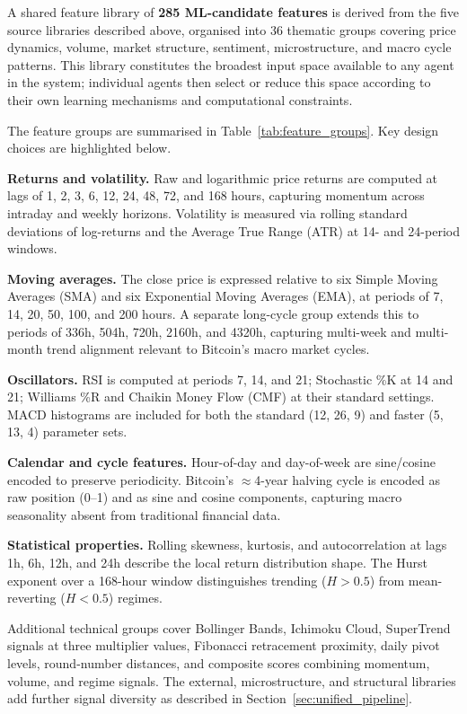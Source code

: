 A shared feature library of \textbf{285 ML-candidate features} is derived from the five source libraries described above, organised into 36 thematic groups covering price dynamics, volume, market structure, sentiment, microstructure, and macro cycle patterns. This library constitutes the broadest input space available to any agent in the system; individual agents then select or reduce this space according to their own learning mechanisms and computational constraints.


The feature groups are summarised in Table~\ref{tab:feature_groups}. Key design choices are highlighted below.


\textbf{Returns and volatility.} Raw and logarithmic price returns are computed at lags of 1, 2, 3, 6, 12, 24, 48, 72, and 168 hours, capturing momentum across intraday and weekly horizons. Volatility is measured via rolling standard deviations of log-returns and the Average True Range (ATR) at 14- and 24-period windows.


\textbf{Moving averages.} The close price is expressed relative to six Simple Moving Averages (SMA) and six Exponential Moving Averages (EMA), at periods of 7, 14, 20, 50, 100, and 200 hours. A separate long-cycle group extends this to periods of 336h, 504h, 720h, 2160h, and 4320h, capturing multi-week and multi-month trend alignment relevant to Bitcoin's macro market cycles.


\textbf{Oscillators.} RSI is computed at periods 7, 14, and 21; Stochastic \%K at 14 and 21; Williams \%R and Chaikin Money Flow (CMF) at their standard settings. MACD histograms are included for both the standard (12, 26, 9) and faster (5, 13, 4) parameter sets.


\textbf{Calendar and cycle features.} Hour-of-day and day-of-week are sine/cosine encoded to preserve periodicity. Bitcoin's $\approx$4-year halving cycle is encoded as raw position (0--1) and as sine and cosine components, capturing macro seasonality absent from traditional financial data.


\textbf{Statistical properties.} Rolling skewness, kurtosis, and autocorrelation at lags 1h, 6h, 12h, and 24h describe the local return distribution shape. The Hurst exponent over a 168-hour window distinguishes trending ($H>0.5$) from mean-reverting ($H<0.5$) regimes.


Additional technical groups cover Bollinger Bands, Ichimoku Cloud, SuperTrend signals at three multiplier values, Fibonacci retracement proximity, daily pivot levels, round-number distances, and composite scores combining momentum, volume, and regime signals. The external, microstructure, and structural libraries add further signal diversity as described in Section~\ref{sec:unified_pipeline}.

